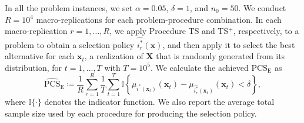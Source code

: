 \documentclass[ijoc,nonblindrev]{informs3}
\def\bx{{\bm x}}
\def\bX{{\bm X}}
\def\PCSE{\mathrm{PCS}_{\mathrm{E}}}
\def\APCSE{\widehat{\mathrm{PCS}}_{\mathrm{E}}}
\begin{document}
In all the problem instances, we set $\alpha = 0.05$, $\delta = 1$, and $n_0 = 50$.
We conduct $R = 10^4$ macro-replications for each problem-procedure combination.
In each macro-replication $r=1,\ldots,R$, we apply Procedure TS and TS$^+$, respectively, to a problem to obtain a selection policy $\widehat{i^*_r}(\bx)$,
and then apply it to select the best alternative for each $\bx_t$, a realization of $\bX$ that is randomly generated from its distribution, for $t=1,\ldots,T$ with $T=10^5$.
We calculate the achieved $\PCSE$ as
\begin{equation}\label{eq-APCSE}
\APCSE\coloneqq  \frac{1}{R} \sum_{r=1}^R \frac{1}{T} \sum_{t=1}^T \mathbb{I} \left\{ \mu_{i^*(\bx_t)}(\bx_t) - \mu_{\widehat{i^*_r}(\bx_t)}(\bx_t)  < \delta \right\},
\end{equation}
where $\mathbb{I}{\{\cdot\}}$ denotes the indicator function.
We also report the average total sample size used by each procedure for producing the selection policy.
\end{document}
